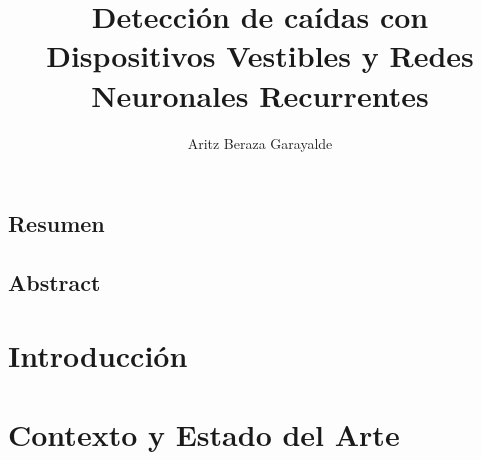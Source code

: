 \documentclass[11pt,a4paper,spanish]{book}
\title{Detección de caídas con Dispositivos Vestibles y Redes Neuronales Recurrentes}
\author{Aritz Beraza Garayalde}
\date{\currenttime}
\begin{document}



\renewcommand{\listfigurename}{Índice de Ilustraciones}
\renewcommand{\listtablename}{Índice de Tablas}
\renewcommand{\contentsname}{Índice de Contenidos}
\renewcommand{\figurename}{Figura}
\renewcommand{\tablename}{Tabla}

\maketitle
\frontmatter
\tableofcontents
\listoffigures
\listoftables

\mainmatter

\section*{Resumen}
%



\section*{Abstract}
%




\chapter{Introducción}\label{chap:intro}
%
%


\chapter{Contexto y Estado del Arte}\label{chap:stateofart}
%

\end{document}
